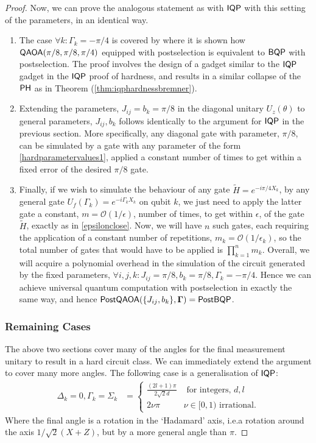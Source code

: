 \begin{proof}
Now, we can prove the analogous statement as with $\operatorname{\textsf{IQP}}$ with this setting of the parameters, in an identical way.
\begin{enumerate}
    \item The case $\forall k: \Gamma_k =  -\pi/4$ is covered by  where it is shown how $\operatorname{\textsf{QAOA}}(\pi/8, \pi/8, \pi/4)$ equipped with postselection is equivalent to $\textsf{BQP}$ with postselection. The proof involves the design of a gadget similar to the $\operatorname{\textsf{IQP}}$ gadget in the $\operatorname{\textsf{IQP}}$ proof of hardness, and results in a similar collapse of the $\operatorname{\textsf{PH}}$ as in Theorem (\ref{thm:iqphardnessbremner}).
    \item Extending the parameters, $J_{ij} = b_{k} = \pi/8$ in the diagonal unitary $U_z(\theta)$ to general parameters, $J_{ij}, b_k$ follows identically to the argument for $\operatorname{\textsf{IQP}}$ in the previous section. More specifically, any diagonal gate with parameter, $\pi/8$, can be simulated by a gate with any parameter of the form \eqref{hardparametervalues1}, applied a constant number of times to get within a fixed error of the desired $\pi/8$ gate.
    \item Finally, if we wish to simulate the behaviour of any gate $\tilde{H} = e^{-i\pi/4 X_k}$, by any general gate $U_f(\Gamma_k) =  e^{-i\Gamma_k X_k}$ on qubit $k$, we just need to apply the latter gate a constant, $m = \mathcal{O}(1/\epsilon)$, number of times, to get within $\epsilon$, of the gate $\tilde{H}$, exactly as in \eqref{epsilonclose}. Now, we will have $n$ such gates, each requiring the application of a constant number of repetitions, $m_k = \mathcal{O}(1/\epsilon_k)$, so the total number of gates that would have to be applied is $\prod\limits_{k=1}^n m_k$.
    Overall, we will acquire a polynomial overhead in the simulation of the circuit generated by the fixed parameters, $\forall i,j,k: J_{ij} = \pi/8,b_k =  \pi/8,\Gamma_k =  -\pi/4$. Hence we can achieve universal quantum computation with postselection in exactly the same way, and hence $\operatorname{\textsf{PostQAOA}}(\{J_{ij}, b_{k}\} , \mathbf{\Gamma}) = \operatorname{\textsf{PostBQP}}$.
\end{enumerate}



\subsubsection*{Remaining Cases}\label{ssec:remaininghardnesscases}
The above two sections cover many of the angles for the final measurement unitary to result in a hard circuit class. We can immediately extend the argument to cover many more angles. 
The following case is a generalisation of $\operatorname{\textsf{IQP}}$:
\begin{align}
        \Delta_k = 0, \Gamma_k = \Sigma_k &=  
        \begin{cases}
            \frac{(2l+1)\pi}{2\sqrt{2}d} &\text{ for integers, } d, l\\
            2\nu \pi& \nu \in[0,1) \text{ irrational.}
        \end{cases}\label{hardparametervaluesgenhadamardapp}
\end{align}
Where the final angle is a rotation in the `Hadamard' axis, i.e.\@\@ a rotation around the axis $1/\sqrt{2}(X+Z)$, but by a more general angle than $\pi$.


\end{proof}
